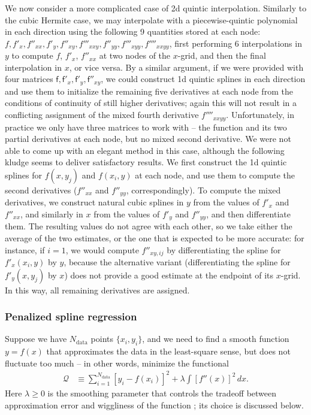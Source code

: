 \documentclass[12pt]{article}
\begin{document}
We now consider a more complicated case of 2d quintic interpolation. Similarly to the cubic Hermite case, we may interpolate with a piecewise-quintic polynomial in each direction using the following 9 quantities stored at each node: $f, f'_x, f''_{xx}, f'_y, f''_{xy}, f'''_{xxy}, f''_{yy}, f'''_{xyy}, f''''_{xxyy}$, first performing 6 interpolations in $y$ to compute $f$, $f'_x$, $f''_{xx}$ at two nodes of the $x$-grid, and then the final interpolation in $x$, or vice versa.
By a similar argument, if we were provided with four matrices $\mathsf{f}, \mathsf{f}'_x, \mathsf{f}'_y, \mathsf{f}''_{xy}$, we could construct 1d quintic splines in each direction and use them to initialize the remaining five derivatives at each node from the conditions of continuity of still higher derivatives; again this will not result in a conflicting assignment of the mixed fourth derivative $f''''_{xxyy}$. Unfortunately, in practice we only have three matrices to work with -- the function and its two partial derivatives at each node, but no mixed second derivative. We were not able to come up with an elegant method in this case, although the following kludge seems to deliver satisfactory results. We first construct the 1d quintic splines for $f(x, y_j)$ and $f(x_i, y)$ at each node, and use them to compute the second derivatives ($f''_{xx}$ and $f''_{yy}$, correspondingly). To compute the mixed derivatives, we construct natural cubic splines in $y$ from the values of $f'_x$ and $f''_{xx}$, and similarly in $x$ from the values of $f'_y$ and $f''_{yy}$, and then differentiate them. The resulting values do not agree with each other, so we take either the average of the two estimates, or the one that is expected to be more accurate: for instance, if $i=1$, we would compute $f''_{xy,ij}$ by differentiating the spline for $f'_x(x_i,y)$ by $y$, because the alternative variant (differentiating the spline for $f'_y(x,y_j)$ by $x$) does not provide a good estimate at the endpoint of its $x$-grid. In this way, all remaining derivatives are assigned.

\subsubsection{Penalized spline regression}  \label{sec:MathSplineApproxDetails}

Suppose we have $N_\mathrm{data}$ points $\{x_i, y_i\}$, and we need to find a smooth function $y=f(x)$ that approximates the data in the least-square sense, but does not fluctuate too much -- in other words, minimize the functional
\begin{align}  \label{eq:ObjectiveSplineFit}
\mathcal{Q} &\equiv \sum_{i=1}^{N_\mathrm{data}} \left[y_i - f(x_i)\right]^2 + \lambda \int \left[f''(x)\right]^2 \,dx .
\end{align}
Here $\lambda\ge 0$ is the smoothing parameter that controls the tradeoff between approximation error and wiggliness of the function \cite{GreenSilverman}; its choice is discussed below.
\end{document}
